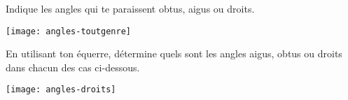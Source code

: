 \vspace{3em}







\begin{exercice}
Indique les angles qui te paraissent obtus, aigus ou droits.
 \begin{center} \texttt{[image: angles-toutgenre]}  \end{center}
\end{exercice}


\begin{exercice}
En utilisant ton équerre, détermine quels sont les angles aigus, obtus ou droits dans chacun des cas ci-dessous.
 \begin{center} \texttt{[image: angles-droits]}  \end{center}
\end{exercice}

\newpage

